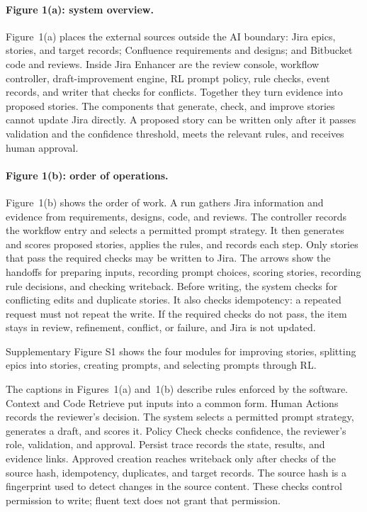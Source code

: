 \documentclass[10pt,a4paper]{article}
\begin{document}
\paragraph{Figure 1(a): system overview.}
Figure~1(a) places the external sources outside the AI boundary: Jira epics, stories, and target records; Confluence requirements and designs; and Bitbucket code and reviews. Inside Jira Enhancer are the review console, workflow controller, draft-improvement engine, RL prompt policy, rule checks, event records, and writer that checks for conflicts. Together they turn evidence into proposed stories. The components that generate, check, and improve stories cannot update Jira directly. A proposed story can be written only after it passes validation and the confidence threshold, meets the relevant rules, and receives human approval.

\paragraph{Figure 1(b): order of operations.}
Figure~1(b) shows the order of work. A run gathers Jira information and evidence from requirements, designs, code, and reviews. The controller records the workflow entry and selects a permitted prompt strategy. It then generates and scores proposed stories, applies the rules, and records each step. Only stories that pass the required checks may be written to Jira. The arrows show the handoffs for preparing inputs, recording prompt choices, scoring stories, recording rule decisions, and checking writeback. Before writing, the system checks for conflicting edits and duplicate stories. It also checks idempotency: a repeated request must not repeat the write. If the required checks do not pass, the item stays in review, refinement, conflict, or failure, and Jira is not updated.

Supplementary Figure S1 shows the four modules for improving stories, splitting epics into stories, creating prompts, and selecting prompts through RL.

The captions in Figures~1(a) and~1(b) describe rules enforced by the software. Context and Code Retrieve put inputs into a common form. Human Actions records the reviewer's decision. The system selects a permitted prompt strategy, generates a draft, and scores it. Policy Check checks confidence, the reviewer's role, validation, and approval. Persist trace records the state, results, and evidence links. Approved creation reaches writeback only after checks of the source hash, idempotency, duplicates, and target records. The source hash is a fingerprint used to detect changes in the source content. These checks control permission to write; fluent text does not grant that permission.
\end{document}
